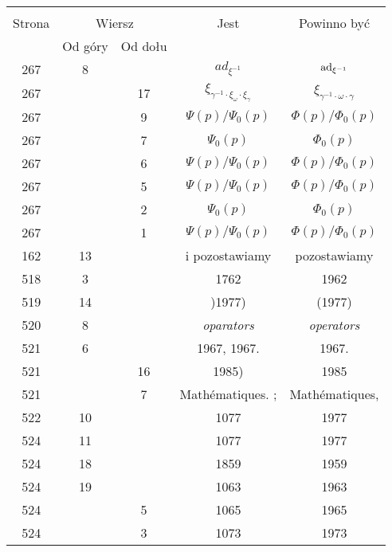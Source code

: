 \documentclass[a4paper,11pt]{article}
\begin{document}
\begin{center}
  \begin{tabular}{|c|c|c|c|c|}
    \hline
    & \multicolumn{2}{c|}{} & & \\
    Strona & \multicolumn{2}{c|}{Wiersz} & Jest
                              & Powinno być \\ \cline{2-3}
    & Od góry & Od dołu & & \\
    \hline
    267 & 8 & & $ad_{ \xi^{ -1 } }$ & $\mathrm{ad}_{ \xi^{ -1 } }$ \\
    267 & & 17 & $\xi_{ \gamma^{ - 1 } \cdot \xi_{ \omega } \cdot \xi_{ \gamma } }$
           & $\xi_{ \gamma^{ - 1 } \cdot \omega \cdot \gamma }$ \\[0.3em]
    267 & &  9 & $\Psi( p ) / \Psi_{ 0 }( p )$
           & $\Phi( p ) / \Phi_{ 0 }( p )$ \\
    267 & &  7 & $\Psi_{ 0 }( p )$ & $\Phi_{ 0 }( p )$ \\
    267 & &  6 & $\Psi( p ) / \Psi_{ 0 }( p )$
           & $\Phi( p ) / \Phi_{ 0 }( p )$ \\
    267 & &  5 & $\Psi( p ) / \Psi_{ 0 }( p )$
           & $\Phi( p ) / \Phi_{ 0 }( p )$ \\
    267 & &  2 & $\Psi_{ 0 }( p )$ & $\Phi_{ 0 }( p )$ \\
    267 & &  1 & $\Psi( p ) / \Psi_{ 0 }( p )$
           & $\Phi( p ) / \Phi_{ 0 }( p )$ \\
    162 & 13 & & i pozostawiamy & pozostawiamy \\
    518 &  3 & & 1762 & 1962 \\
    519 & 14 & & )1977) & (1977) \\
    520 &  8 & & \textit{oparators} & \textit{operators} \\
    521 &  6 & & 1967, 1967. & 1967. \\
    521 & & 16 & 1985) & 1985 \\
    521 & &  7 & Math\'{e}matiques. ; & Math\'{e}matiques, \\
    522 & 10 & & 1077 & 1977 \\
    524 & 11 & & 1077 & 1977 \\
    524 & 18 & & 1859 & 1959 \\
    524 & 19 & & 1063 & 1963 \\
    524 & &  5 & 1065 & 1965 \\
    524 & &  3 & 1073 & 1973 \\
    \hline
  \end{tabular}

\end{center}
\end{document}

